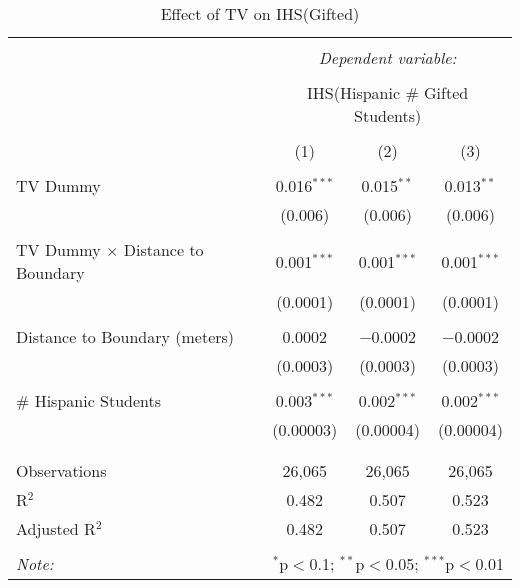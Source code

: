 
\begin{table}[!htbp] \centering 
  \caption{Effect of TV on IHS(Gifted)} 
  \label{} 
\begin{tabular}{@{\extracolsep{-2pt}}lccc} 
\\[-1.8ex]\hline 
\hline \\[-1.8ex] 
 & \multicolumn{3}{c}{\textit{Dependent variable:}} \\ 
\cline{2-4} 
\\[-1.8ex] & \multicolumn{3}{c}{IHS(Hispanic \# Gifted Students)} \\ 
\\[-1.8ex] & (1) & (2) & (3)\\ 
\hline \\[-1.8ex] 
 TV Dummy & 0.016$^{***}$ & 0.015$^{**}$ & 0.013$^{**}$ \\ 
  & (0.006) & (0.006) & (0.006) \\ 
  & & & \\ 
 TV Dummy $\times$ Distance to Boundary & 0.001$^{***}$ & 0.001$^{***}$ & 0.001$^{***}$ \\ 
  & (0.0001) & (0.0001) & (0.0001) \\ 
  & & & \\ 
 Distance to Boundary (meters) & 0.0002 & $-$0.0002 & $-$0.0002 \\ 
  & (0.0003) & (0.0003) & (0.0003) \\ 
  & & & \\ 
 \# Hispanic Students & 0.003$^{***}$ & 0.002$^{***}$ & 0.002$^{***}$ \\ 
  & (0.00003) & (0.00004) & (0.00004) \\ 
  & & & \\ 
\hline \\[-1.8ex] 
Observations & 26,065 & 26,065 & 26,065 \\ 
R$^{2}$ & 0.482 & 0.507 & 0.523 \\ 
Adjusted R$^{2}$ & 0.482 & 0.507 & 0.523 \\ 
\hline 
\hline \\[-1.8ex] 
\textit{Note:}  & \multicolumn{3}{r}{$^{*}$p$<$0.1; $^{**}$p$<$0.05; $^{***}$p$<$0.01} \\ 
\end{tabular} 
\end{table} 
